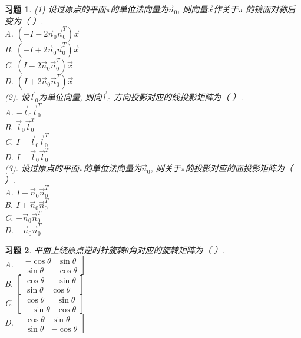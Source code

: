 \documentclass[a4paper]{book}
\newtheorem{ex}{习题}[chapter]
\begin{document}
\begin{ex}\label{8.8}
(1) 设过原点的平面$\pi$的单位法向量为$\vec{n}_0$, 则向量$\vec{x}$作关于$\pi$ 的镜面对称后变为（     ）.\\
A. $(-I-2\vec{n}_0\vec{n}_0^T )\vec{x}$\\
B. $(-I+2\vec{n}_0\vec{n}_0^T )\vec{x}$\\
C. $(I-2\vec{n}_0\vec{n}_0^T )\vec{x}$\\
D. $(I+2\vec{n}_0\vec{n}_0^T )\vec{x}$\\
(2). 设$\vec{l}_0$为单位向量, 则向$\vec{l}_0$ 方向投影对应的线投影矩阵为（     ）.\\
A. $-\vec{l}_0 \vec{l}_0^T$\\
B. $\vec{l}_0 \vec{l}_0^T$\\
C. $I-\vec{l}_0 \vec{l}_0^T$\\
D. $I-\vec{l}_0 \vec{l}_0^T$\\
(3). 设过原点的平面$\pi$的单位法向量为$\vec{n}_0$, 则关于$\pi$的投影对应的面投影矩阵为（      ）.\\
A. $I-\vec{n}_0 \vec{n}_0^T$\\
B. $I+\vec{n}_0 \vec{n}_0^T$\\
C. $-\vec{n}_0 \vec{n}_0^T$\\
D. $-\vec{n}_0 \vec{n}_0^T$
\end{ex}

\begin{ex}\label{8.9}
平面上绕原点逆时针旋转$\theta$角对应的旋转矩阵为（      ）.\\
A.  $\begin{bmatrix}-\cos\theta&\sin\theta \\ \sin\theta&\cos\theta\end{bmatrix}$\\
B.  $\begin{bmatrix}\cos\theta&-\sin\theta \\ \sin\theta&\cos\theta\end{bmatrix}$\\
C. $\begin{bmatrix}\cos\theta&\sin\theta \\ -\sin\theta&\cos\theta\end{bmatrix}$\\
D. $\begin{bmatrix}\cos\theta&\sin\theta \\ \sin\theta&-\cos\theta\end{bmatrix}$
\end{ex}
\end{document}
